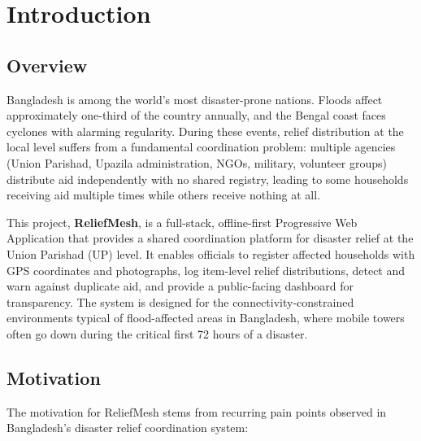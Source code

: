 \chapter{Introduction}

\section{Overview}

Bangladesh is among the world's most disaster-prone nations. Floods affect approximately one-third of the country annually, and the Bengal coast faces cyclones with alarming regularity. During these events, relief distribution at the local level suffers from a fundamental coordination problem: multiple agencies (Union Parishad, Upazila administration, NGOs, military, volunteer groups) distribute aid independently with no shared registry, leading to some households receiving aid multiple times while others receive nothing at all.

This project, \textbf{ReliefMesh}, is a full-stack, offline-first Progressive Web Application that provides a shared coordination platform for disaster relief at the Union Parishad (UP) level. It enables officials to register affected households with GPS coordinates and photographs, log item-level relief distributions, detect and warn against duplicate aid, and provide a public-facing dashboard for transparency. The system is designed for the connectivity-constrained environments typical of flood-affected areas in Bangladesh, where mobile towers often go down during the critical first 72 hours of a disaster.

\section{Motivation}

The motivation for ReliefMesh stems from recurring pain points observed in Bangladesh's disaster relief coordination system:

